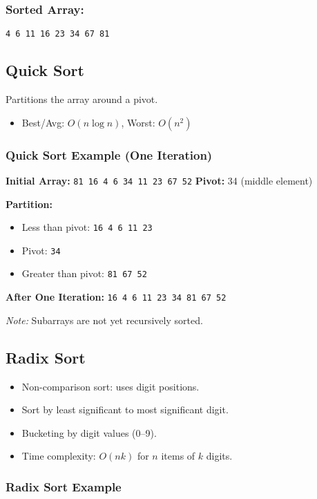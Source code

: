 \documentclass[11pt]{article}
\begin{document}
\subsubsection*{Sorted Array:}
\verb|4 6 11 16 23 34 67 81|

\subsection*{Quick Sort}
Partitions the array around a pivot.

\begin{itemize}
  \item Best/Avg: $O(n \log n)$, Worst: $O(n^2)$
\end{itemize}

\subsubsection*{Quick Sort Example (One Iteration)}
\textbf{Initial Array:} \verb|81 16 4 6 34 11 23 67 52|  
\textbf{Pivot:} 34 (middle element)

\textbf{Partition:}
\begin{itemize}
  \item Less than pivot: \verb|16 4 6 11 23|
  \item Pivot: \verb|34|
  \item Greater than pivot: \verb|81 67 52|
\end{itemize}

\textbf{After One Iteration:}
\verb|16 4 6 11 23 34 81 67 52|

\textit{Note:} Subarrays are not yet recursively sorted.

\subsection*{Radix Sort}
\begin{itemize}
  \item Non-comparison sort: uses digit positions.
  \item Sort by least significant to most significant digit.
  \item Bucketing by digit values (0–9).
  \item Time complexity: $O(nk)$ for $n$ items of $k$ digits.
\end{itemize}

\subsubsection*{Radix Sort Example}
\end{document}
